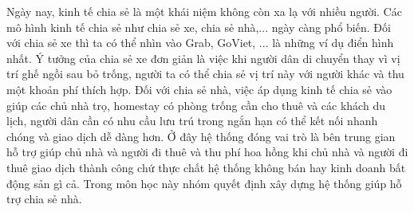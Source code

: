 Ngày nay, kinh tế chia sẻ là một khái niệm không còn xa lạ với nhiều người.
Các mô hình kinh tế chia sẻ như chia sẻ xe, chia sẻ nhà,... ngày càng phổ biến.
Đối với chia sẻ xe thì ta có thể nhìn vào Grab, GoViet, ... là những ví dụ điển
hình nhất. Ý tưởng của chia sẻ xe đơn giản là việc khi người dân di chuyển thay
vì vị trí ghế ngồi sau bỏ trống, người ta có thể chia sẻ vị trí này với người khác
và thu một khoản phí thích hợp. Đối với chia sẻ nhà, việc áp dụng kinh tế chia
sẻ vào giúp các chủ nhà trọ, homestay có phòng trống cần cho thuê và các khách
du lịch, người dân cần có nhu cầu lưu trú trong ngắn hạn có thể kết nối nhanh
chóng và giao dịch dễ dàng hơn. Ở đây hệ thống đóng vai trò là bên trung gian
hỗ trợ giúp chủ nhà và người đi thuê và thu phí hoa hồng khi chủ nhà và người
đi thuê giao dịch thành công chứ thực chất hệ thống không bán hay kinh doanh
bất động sản gì cả. Trong môn học này nhóm quyết định xây dựng hệ thống
giúp hỗ trợ chia sẻ nhà.